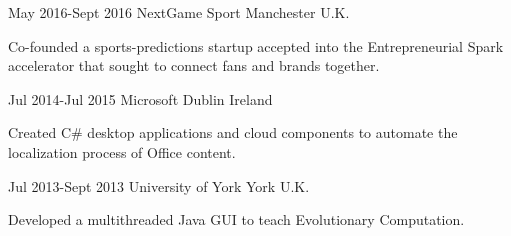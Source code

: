 \documentclass[10pt]{CurriculumVitae}
\begin{document}
      {May 2016-Sept 2016}
      {NextGame Sport} 
      {Manchester}
      {U.K.}
      {
        \item Co-founded a sports-predictions startup accepted into the Entrepreneurial Spark accelerator that sought to connect fans and brands together.
      }
  
      {Jul 2014-Jul 2015}
      {Microsoft} 
      {Dublin}
      {Ireland}
      {
        \item Created C\# desktop applications and cloud components to automate the localization process of Office content.
      }
    
      {Jul 2013-Sept 2013}
      {University of York}
      {York}
      {U.K.}
      {
        \item Developed a multithreaded Java GUI to teach Evolutionary Computation.
      } 
\end{document}
